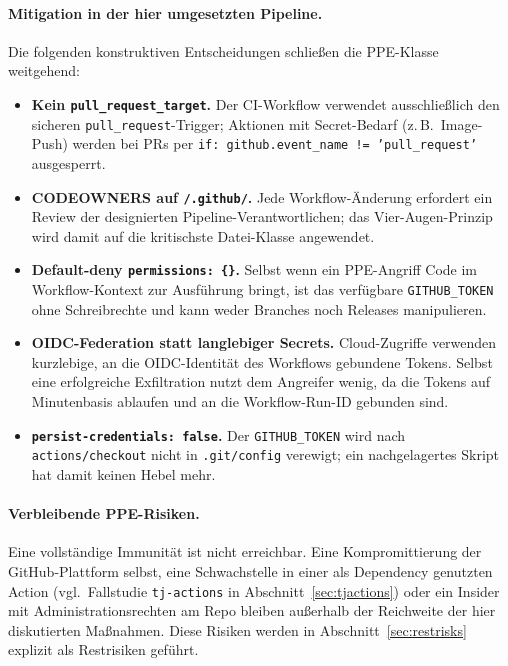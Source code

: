 \documentclass[12pt, a4paper]{scrartcl}
\begin{document}
\paragraph{Mitigation in der hier umgesetzten Pipeline.}
Die folgenden konstruktiven Entscheidungen schließen die
PPE-Klasse weitgehend:
\begin{itemize}[leftmargin=1.4em]
  \item \textbf{Kein \texttt{pull\_request\_target}.} Der CI-Workflow
        verwendet ausschließlich den sicheren \texttt{pull\_request}-Trigger;
        Aktionen mit Secret-Bedarf (z.\,B.\ Image-Push) werden bei PRs
        per \texttt{if: github.event\_name != 'pull\_request'}
        ausgesperrt.
  \item \textbf{CODEOWNERS auf \texttt{/.github/}.} Jede
        Workflow-Änderung erfordert ein Review der designierten
        Pipeline-Verantwortlichen; das Vier-Augen-Prinzip wird damit auf
        die kritischste Datei-Klasse angewendet.
  \item \textbf{Default-deny \texttt{permissions: \{\}}.} Selbst
        wenn ein PPE-Angriff Code im Workflow-Kontext zur Ausführung
        bringt, ist das verfügbare \texttt{GITHUB\_TOKEN} ohne
        Schreibrechte und kann weder Branches noch Releases
        manipulieren.
  \item \textbf{OIDC-Federation statt langlebiger Secrets.}
        Cloud-Zugriffe verwenden kurzlebige, an die OIDC-Identität des
        Workflows gebundene Tokens. Selbst eine erfolgreiche
        Exfiltration nutzt dem Angreifer wenig, da die Tokens auf
        Minutenbasis ablaufen und an die Workflow-Run-ID gebunden sind.
  \item \textbf{\texttt{persist-credentials: false}.} Der
        \texttt{GITHUB\_TOKEN} wird nach \texttt{actions/checkout}
        nicht in \texttt{.git/config} verewigt; ein nachgelagertes
        Skript hat damit keinen Hebel mehr.
\end{itemize}

\paragraph{Verbleibende PPE-Risiken.}
Eine vollständige Immunität ist nicht erreichbar. Eine
Kompromittierung der GitHub-Plattform selbst, eine Schwachstelle in
einer als Dependency genutzten Action (vgl.\ Fallstudie
\texttt{tj-actions} in Abschnitt~\ref{sec:tjactions}) oder ein
Insider mit Administrationsrechten am Repo bleiben außerhalb der
Reichweite der hier diskutierten Maßnahmen. Diese Risiken werden in
Abschnitt~\ref{sec:restrisks} explizit als Restrisiken geführt.
\end{document}
